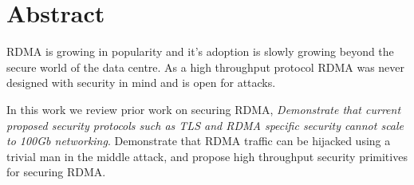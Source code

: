 \section*{Abstract}
\label{sec:abstract}

RDMA is growing in popularity and it's adoption is slowly growing beyond the
secure world of the data centre. As a high throughput protocol RDMA was never
designed with security in mind and is open for attacks.

In this work we review prior work on securing RDMA, \emph{Demonstrate that
current proposed security protocols such as TLS and RDMA specific security cannot
scale to 100Gb networking}. Demonstrate that RDMA traffic can be hijacked using
a trivial man in the middle attack, and propose high throughput security
primitives for securing RDMA.
